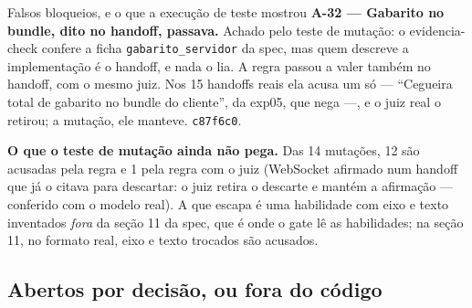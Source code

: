 \documentclass[11pt,a4paper]{article}
\begin{document}
\begin{sucessobox}{Falsos bloqueios, e o que a execução de teste mostrou}
\medskip
\textbf{A-32 --- Gabarito no bundle, dito no handoff, passava.} Achado pelo teste de mutação: o evidencia-check confere a ficha \texttt{gabarito\_servidor} da spec, mas quem descreve a implementação é o handoff, e nada o lia. A regra passou a valer também no handoff, com o mesmo juiz. Nos 15 handoffs reais ela acusa um só --- ``Cegueira total de gabarito no bundle do cliente'', da exp05, que nega ---, e o juiz real o retirou; a mutação, ele manteve. \texttt{c87f6c0}.

\medskip
\textbf{O que o teste de mutação ainda não pega.} Das 14 mutações, 12 são acusadas pela regra e 1 pela regra com o juiz (WebSocket afirmado num handoff que já o citava para descartar: o juiz retira o descarte e mantém a afirmação --- conferido com o modelo real). A que escapa é uma habilidade com eixo e texto inventados \emph{fora} da seção 11 da spec, que é onde o gate lê as habilidades; na seção 11, no formato real, eixo e texto trocados são acusados.
\end{sucessobox}

\subsection{Abertos por decisão, ou fora do código}\label{sec:decisoes}
\end{document}
